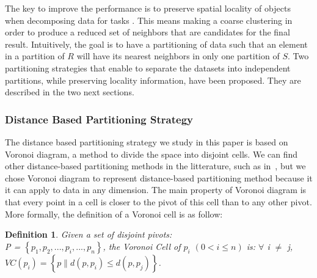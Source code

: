 \documentclass[10pt,journal,compsoc]{IEEEtran}
\newtheorem{myDef}{Definition}
\begin{document}
The key to improve the performance is to preserve spatial locality of objects when decomposing data for tasks \cite{Zhou:1998:DPP:594718.594759}. This means making a coarse clustering in order to produce a reduced set of neighbors that are candidates for the final result. Intuitively, the goal is to have a partitioning of data such that an element in a partition of $R$ will have its nearest neighbors in only one partition of $S$. 
Two partitioning strategies that enable to separate the datasets into independent partitions, while preserving locality 
information, have 
been proposed. They are described in the two next sections. 

\subsubsection{Distance Based Partitioning Strategy}
The distance based partitioning strategy we study in this paper is based on Voronoi diagram, a method to divide the space into disjoint cells. We can find other distance-based partitioning methods in the litterature, such as in~\cite{Ji:2012:IGK:2408853.2408998}, but we chose Voronoi diagram to represent distance-based partitioning method because it it can apply to data in any dimension. 
The main property of Voronoi diagram 
is that every point in a cell is
closer to the pivot of this cell than to any other pivot. More formally, the 
definition of a Voronoi cell is as follow:
\begin{myDef}
Given a set of disjoint pivots: \\ P = $\left\{ p_1, p_2, ..., p_i, ..., p_n \right\}$, the Voronoi Cell of $p_i$ $\left(0 < 
i \leq n \right)$ is: $
\forall$ i $\neq$ j, $VC\left(p_i\right) = \left\{p \| d\left(p, p_i\right) \leq d\left(p, p_j\right) \right\}$. 
\end{myDef}
\end{document}
